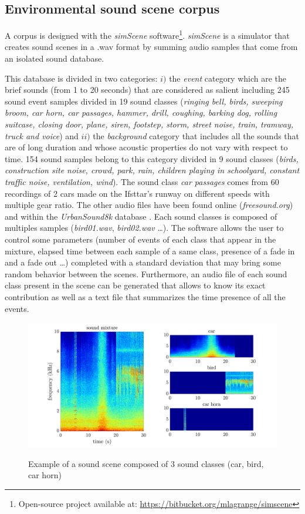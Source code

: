 \documentclass[twocolumn,a4paper,10pt]{article}
\begin{document}
\subsection{Environmental sound scene corpus}

A corpus is designed with the \textit{simScene} software\footnote{Open-source project available at: \url{https://bitbucket.org/mlagrange/simscene}}. \textit{simScene} \cite{rossignol_simscene:_2015} is a simulator that creates sound scenes in a .wav format by summing audio samples that come from an isolated sound database.

This database is divided in two categories: $i)$ the \textit{event} category which are the brief sounds (from 1 to 20 seconds) that are considered as salient including 245 sound event samples divided in 19 sound classes (\textit{ringing bell, birds, sweeping broom, car horn, car passages, hammer, drill, coughing, barking dog, rolling suitcase, closing door, plane, siren, footstep, storm, street noise, train, tramway, truck and voice}) and $ii)$ the \textit{background} category that includes all the sounds that are of long duration and whose acoustic properties do not vary with respect to time. 154 sound samples belong to this category divided in 9 sound classes (\textit{birds, construction site noise, crowd, park, rain, children playing in schoolyard, constant traffic noise, ventilation, wind}). The sound class \textit{car passages} comes from 60 recordings of 2 cars made on the Ifsttar's runway on different speeds with multiple gear ratio. The other audio files have been found online (\textit{freesound.org}) and within the \textit{UrbanSound8k} database \cite{salamon_dataset_nodate}. Each sound classes is composed of multiples samples (\textit{bird01.wav}, \textit{bird02.wav} \dots).
The software allows the user to control some parameters (number of events of each class that appear in the mixture, elapsed time between each sample of a same class, presence of a fade in and a fade out \dots) completed with a standard deviation that may bring some random behavior between the scenes. Furthermore, an audio file of each sound class present in the scene can be generated that allows to know its exact contribution as well as a text file that summarizes the time presence of all the events.\\

\begin{figure}[t]
\centering
\includegraphics[width=\linewidth]{figures/exampleSimScene2.pdf}
\label{fig:exampleSimScene}
\caption{Example of a sound scene composed of 3 sound classes (car, bird, car horn)}
\end{figure}
\end{document}
